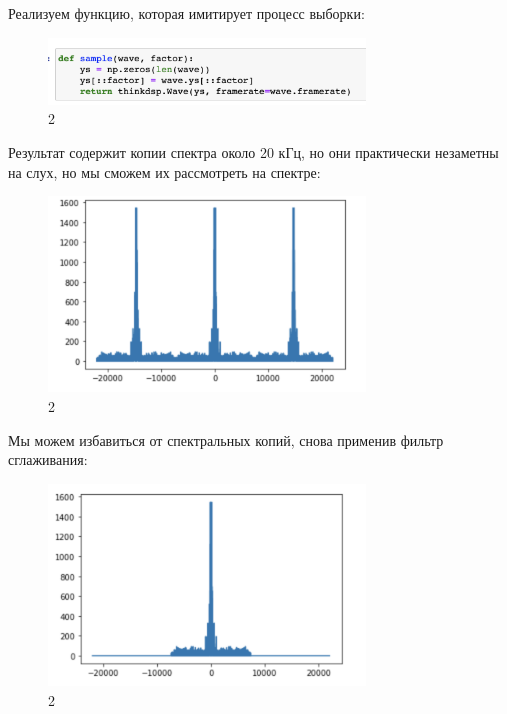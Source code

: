 \documentclass[10pt,a4paper,oneside]{article}
\begin{document}
Реализуем функцию, которая имитирует процесс выборки:

\begin{figure}[H]
        \centering
        \includegraphics[width=0.75\textwidth]{pics/4.png}
        \caption{2}
        \label{fig:first}
\end{figure}

Результат содержит копии спектра около 20 кГц, но они практически незаметны на слух, но мы сможем их рассмотреть на спектре:

\begin{figure}[H]
        \centering
        \includegraphics[width=0.75\textwidth]{pics/5.png}
        \caption{2}
        \label{fig:first}
\end{figure}

Мы можем избавиться от спектральных копий, снова применив фильтр сглаживания:

\begin{figure}[H]
        \centering
        \includegraphics[width=0.75\textwidth]{pics/6.png}
        \caption{2}
        \label{fig:first}
\end{figure}
\end{document}

